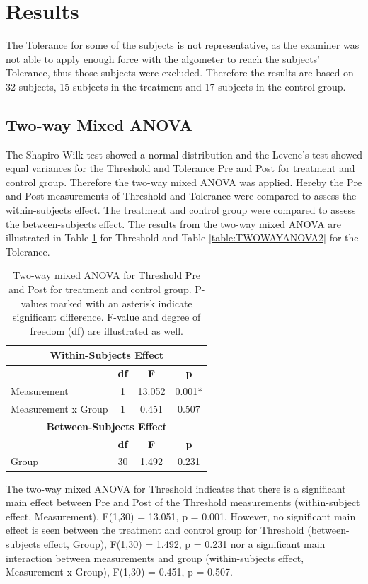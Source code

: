 \section{Results}
The Tolerance for some of the subjects is not representative, as the examiner was not able to apply enough force with the algometer to reach the subjects' Tolerance, thus those subjects were excluded. 
Therefore the results are based on 32 subjects, 15 subjects in the treatment and 17 subjects in the control group. 

\subsection{Two-way Mixed ANOVA}
The Shapiro-Wilk test showed a normal distribution and the Levene's test showed equal variances for the Threshold and Tolerance Pre and Post for treatment and control group. Therefore the two-way mixed ANOVA was applied. Hereby the Pre and Post measurements of Threshold and Tolerance were compared to assess the within-subjects effect. The treatment and control group were compared to assess the between-subjects effect. The results from the two-way mixed ANOVA are illustrated in Table \ref{table:TWOWAYANOVA1} for Threshold and Table \ref{table:TWOWAYANOVA2} for the Tolerance. 

\begin{table}[ht]
\caption{Two-way mixed ANOVA for Threshold Pre and Post for treatment and control group. P-values marked with an asterisk indicate significant difference. F-value and degree of freedom (df) are illustrated as well.}
\centering
\begin{tabular}{l c c c}
\toprule
\multicolumn{4}{c}{\textbf{Within-Subjects Effect}} \\
\midrule
& \textbf{df} &\textbf{F} & \textbf{p} \\ [0.5ex] %
Measurement & 1 & 13.052 &  0.001* \\
Measurement x Group & 1 & 0.451 & 0.507 \\
\toprule
\multicolumn{4}{c}{\textbf{Between-Subjects Effect}} \\
\midrule 
& \textbf{df} & \textbf{F} & \textbf{p} \\ [0.5ex] %
Group & 30 & 1.492 &  0.231 \\
\hline
\end{tabular}
\label{table:TWOWAYANOVA1}
\end{table}

The two-way mixed ANOVA for Threshold indicates that there is a significant main effect between Pre and Post of the Threshold measurements (within-subject effect, Measurement), F(1,30) = 13.051, p = 0.001. However, no significant main effect is seen between the treatment and control group for Threshold (between-subjects effect, Group), F(1,30) = 1.492, p = 0.231 nor a significant main interaction between measurements and group (within-subjects effect, Measurement x Group), F(1,30) = 0.451, p = 0.507. 

